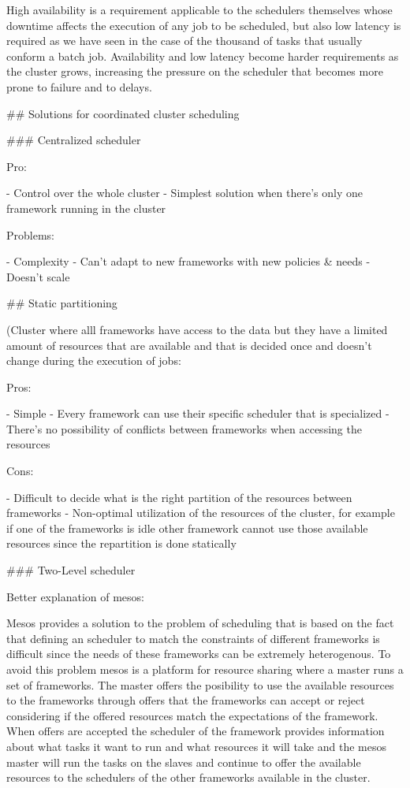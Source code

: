 High availability is a requirement applicable to the schedulers
themselves whose downtime affects the execution of any job to be
scheduled, but also low latency is required as we have seen in the
case of the thousand of tasks that usually conform a batch
job. Availability and low latency become harder requirements as the
cluster grows, increasing the pressure on the scheduler that becomes
more prone to failure and to delays.

## Solutions for coordinated cluster scheduling


### Centralized scheduler

Pro:

- Control over the whole cluster
- Simplest solution when there's only one framework running in the cluster

Problems:

- Complexity
- Can't adapt to new frameworks with new policies & needs
- Doesn't scale

## Static partitioning

(Cluster where alll frameworks have access to the data but they have a
limited amount of resources that are available and that is decided
once and doesn't change during the execution of jobs:

Pros:

- Simple
- Every framework can use their specific scheduler that is specialized
- There's no possibility of conflicts between frameworks when
  accessing the resources

Cons:

- Difficult to decide what is the right partition of the resources
between frameworks
- Non-optimal utilization of the resources of the cluster, for example
if one of the frameworks is idle other framework cannot use those
available resources since the repartition is done statically

### Two-Level scheduler

Better explanation of mesos:

Mesos provides a solution to the problem of scheduling that is based
on the fact that defining an scheduler to match the constraints of different
frameworks is difficult since the needs of these frameworks can be
extremely heterogenous. To avoid this problem mesos is a platform for
resource sharing where a master runs a set of frameworks. The master
offers the posibility to use the available resources to the frameworks
through offers that the frameworks can accept or reject considering if
the offered resources match the expectations of the framework. When
offers are accepted the scheduler of the framework provides
information about what tasks it want to run and what resources it will
take and the mesos master will run the tasks on the slaves and
continue to offer the available resources to the schedulers of the
other frameworks available in the cluster.

